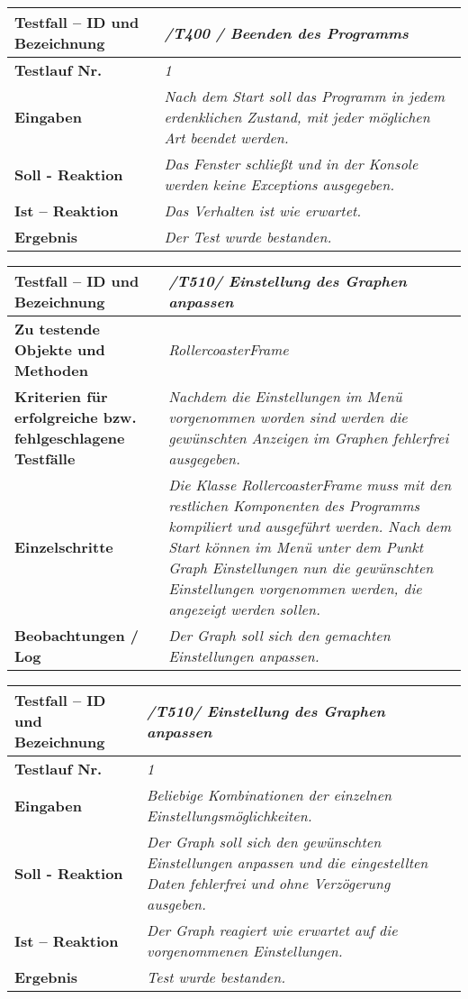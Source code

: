 \begin{longtable}{|p{7cm}|p{10cm}|}
\hline
\textbf{Testfall -- ID und Bezeichnung} & \textit{ /T400 / Beenden des Programms} \\
\hline
\textbf{Testlauf Nr.} & \textit{1} \\
\hline
\textbf{Eingaben} & \textit{Nach dem Start soll das Programm in jedem erdenklichen Zustand, mit jeder möglichen Art beendet werden.} \\
\hline
\textbf{Soll - Reaktion} & \textit{Das Fenster schließt und in der Konsole werden keine Exceptions ausgegeben.} \\
\hline
\textbf{Ist -- Reaktion} & \textit{Das Verhalten ist wie erwartet.} \\
\hline
\textbf{Ergebnis} & \textit{Der Test wurde bestanden.} \\
\hline
\end{longtable}

\begin{longtable}{|p{7cm}|p{10cm}|}
\hline
\textbf{Testfall -- ID und Bezeichnung} &  \textit{/T510/ Einstellung des Graphen anpassen} \\
\hline
\textbf{Zu testende Objekte und Methoden} &  \textit{RollercoasterFrame}
\\
\hline
\textbf{Kriterien für erfolgreiche bzw. fehlgeschlagene Testfälle} &
\textit{Nachdem die Einstellungen im Menü vorgenommen worden sind werden die gewünschten Anzeigen im Graphen fehlerfrei ausgegeben. } \\
\hline
\textbf{Einzelschritte} &  \textit{Die Klasse RollercoasterFrame muss mit den restlichen Komponenten des Programms kompiliert und ausgeführt werden. Nach dem Start können im Menü unter dem Punkt
Graph Einstellungen nun die gewünschten Einstellungen vorgenommen werden, die angezeigt werden sollen.} \\
\hline
\textbf{Beobachtungen / Log} &  \textit{Der Graph soll sich den gemachten Einstellungen anpassen.} \\
\hline
\end{longtable}

\begin{longtable}{|p{7cm}|p{10cm}|}
\hline
\textbf{Testfall -- ID und Bezeichnung} & \textit{ /T510/ Einstellung des Graphen anpassen} \\
\hline
\textbf{Testlauf Nr.} & \textit{1} \\
\hline
\textbf{Eingaben} & \textit{Beliebige Kombinationen der einzelnen Einstellungsmöglichkeiten.} \\
\hline
\textbf{Soll - Reaktion} & \textit{Der Graph soll sich den gewünschten Einstellungen anpassen und die eingestellten Daten fehlerfrei und ohne Verzögerung ausgeben.} \\
\hline
\textbf{Ist -- Reaktion} & \textit{Der Graph reagiert wie erwartet auf die vorgenommenen Einstellungen.} \\
\hline
\textbf{Ergebnis} & \textit{Test wurde bestanden.} \\
\hline
\end{longtable}


